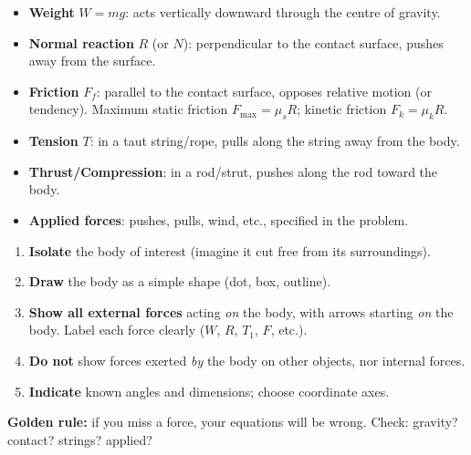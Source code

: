 \documentclass[11pt]{article}
\begin{document}
\begin{definition}
\begin{itemize}
\item \textbf{Weight} $W=mg$: acts vertically downward through the centre of gravity.
\item \textbf{Normal reaction} $R$ (or $N$): perpendicular to the contact surface, pushes away from the surface.
\item \textbf{Friction} $F_f$: parallel to the contact surface, opposes relative motion (or tendency). Maximum static friction $F_{\max}=\mu_s R$; kinetic friction $F_k=\mu_k R$.
\item \textbf{Tension} $T$: in a taut string/rope, pulls along the string away from the body.
\item \textbf{Thrust/Compression}: in a rod/strut, pushes along the rod toward the body.
\item \textbf{Applied forces}: pushes, pulls, wind, etc., specified in the problem.
\end{itemize}
\end{definition}

\begin{methode}
\begin{enumerate}
\item \textbf{Isolate} the body of interest (imagine it cut free from its surroundings).
\item \textbf{Draw} the body as a simple shape (dot, box, outline).
\item \textbf{Show all external forces} acting \emph{on} the body, with arrows starting \emph{on} the body. Label each force clearly ($W$, $R$, $T_1$, $F$, etc.).
\item \textbf{Do not} show forces exerted \emph{by} the body on other objects, nor internal forces.
\item \textbf{Indicate} known angles and dimensions; choose coordinate axes.
\end{enumerate}
\textbf{Golden rule:} if you miss a force, your equations will be wrong. Check: gravity? contact? strings? applied?
\end{methode}
\end{document}
